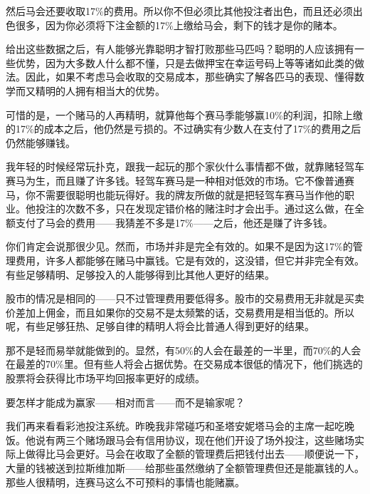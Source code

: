 然后马会还要收取17\%的费用。所以你不但必须比其他投注者出色，而且还必须出色很多，因为你必须将下注金额的17\%上缴给马会，剩下的钱才是你的赌本。
\par

给出这些数据之后，有人能够光靠聪明才智打败那些马匹吗？聪明的人应该拥有一些优势，因为大多数人什么都不懂，只是去做押宝在幸运号码上等等诸如此类的做法。因此，如果不考虑马会收取的交易成本，那些确实了解各匹马的表现、懂得数学而又精明的人拥有相当大的优势。
\par

可惜的是，一个赌马的人再精明，就算他每个赛马季能够赢10\%的利润，扣除上缴的17\%的成本之后，他仍然是亏损的。不过确实有少数人在支付了17\%的费用之后仍然能够赚钱。
\par

我年轻的时候经常玩扑克，跟我一起玩的那个家伙什么事情都不做，就靠赌轻驾车赛马为生，而且赚了许多钱。轻驾车赛马是一种相对低效的市场。它不像普通赛马，你不需要很聪明也能玩得好。我的牌友所做的就是把轻驾车赛马当作他的职业。他投注的次数不多，只在发现定错价格的赌注时才会出手。通过这么做，在全额支付了马会的费用——我猜差不多是17\%——之后，他还是赚了许多钱。
\par

你们肯定会说那很少见。然而，市场并非是完全有效的。如果不是因为这17\%的管理费用，许多人都能够在赌马中赢钱。它是有效的，这没错，但它并非完全有效。有些足够精明、足够投入的人能够得到比其他人更好的结果。
\par

股市的情况是相同的——只不过管理费用要低得多。股市的交易费用无非就是买卖价差加上佣金，而且如果你的交易不是太频繁的话，交易费用是相当低的。所以呢，有些足够狂热、足够自律的精明人将会比普通人得到更好的结果。
\par

那不是轻而易举就能做到的。显然，有50\%的人会在最差的一半里，而70\%的人会在最差的70\%里。但有些人将会占据优势。在交易成本很低的情况下，他们挑选的股票将会获得比市场平均回报率更好的成绩。
\par

要怎样才能成为赢家——相对而言——而不是输家呢？
\par

我们再来看看彩池投注系统。昨晚我非常碰巧和圣塔安妮塔马会的主席一起吃晚饭。他说有两三个赌场跟马会有信用协议，现在他们开设了场外投注，这些赌场实际上做得比马会更好。马会在收取了全额的管理费后把钱付出去——顺便说一下，大量的钱被送到拉斯维加斯——给那些虽然缴纳了全额管理费但还是能赢钱的人。那些人很精明，连赛马这么不可预料的事情也能赌赢。
\par

